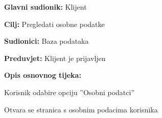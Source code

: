                         \noindent {}
					\begin{packed_item}
	
						\item \textbf{Glavni sudionik: }Klijent
						\item  \textbf{Cilj:} Pregledati osobne podatke
						\item  \textbf{Sudionici:} Baza podataka
						\item  \textbf{Preduvjet:} Klijent je prijavljen
						\item  \textbf{Opis osnovnog tijeka:}
						
						\item[] \begin{packed_enum}
	
							\item Korisnik odabire opciju ”Osobni podatci”
							\item Otvara se stranica s osobnim podacima korisnika
							
							
						\end{packed_enum}

                    
					\end{packed_item}

